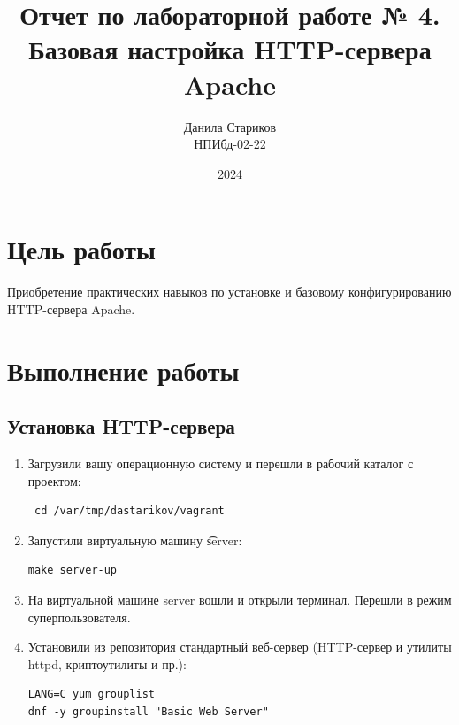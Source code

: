 

\title{Отчет по лабораторной работе № 4. \\ Базовая настройка HTTP-сервера Apache}
\author{Данила Стариков \\ НПИбд-02-22}
\date{2024}



\maketitle
\newpage

\tableofcontents

\newpage
\section{Цель работы}
Приобретение практических навыков по установке и базовому конфигурированию HTTP-сервера Apache.
\newpage
\section{Выполнение работы}

\subsection{Установка HTTP-сервера}
\begin{enumerate}

\item Загрузили вашу операционную систему и перешли в рабочий каталог с проектом:
\begin{verbatim}
 cd /var/tmp/dastarikov/vagrant
\end{verbatim}

\item Запустили виртуальную машину {\t server}:
\begin{verbatim}
make server-up
\end{verbatim}
\item На виртуальной машине server вошли и открыли терминал. Перешли в режим суперпользователя.
\item Установили из репозитория стандартный веб-сервер (HTTP-сервер и утилиты httpd, криптоутилиты и пр.):
\begin{verbatim}
LANG=C yum grouplist
dnf -y groupinstall "Basic Web Server"
\end{verbatim}
\end{enumerate}

